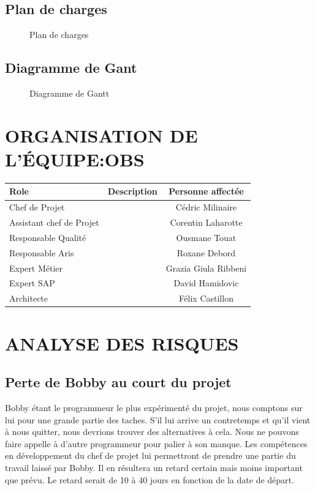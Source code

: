 \documentclass[]{scrartcl}
\begin{document}
\subsection{Plan de charges}
\begin{center}
\begin{figure}[H]
\caption{Plan de charges}
\end{figure}
\end{center}
\subsection{Diagramme de Gant}
\begin{figure}[H]
\caption{Diagramme de Gantt}
\end{figure}
\section{ORGANISATION DE L'ÉQUIPE:OBS}
\begin{center}
	\begin{tabular}{| l | c | c |}
	\hline
	Role                     & Description & Personne affectée  \\ 	\hline
	Chef de Projet           &             & Cédric Milinaire                   	\\ \hline
	Assistant chef de Projet &             & Corentin Laharotte                  	\\ \hline
	Responsable Qualité      &             & Ousmane Touat                 	\\ \hline
	Responsable Aris         &             & Roxane Debord                 	\\ \hline
	Expert Métier            &             & Grazia Giula Ribbeni                 	\\ \hline
	Expert SAP               &             & David Hamidovic                 	\\ \hline
	Architecte               &             & Félix Castillon  \\ 		\hline
	\end{tabular}
\end{center}

\section{ANALYSE DES RISQUES}
\subsection{Perte de Bobby au court du projet}
Bobby étant le programmeur le plus expérimenté du projet, nous comptons sur lui pour une grande partie des taches. S’il lui arrive un contretemps et qu’il vient à nous quitter, nous devrions trouver des alternatives à cela. Nous ne pouvons faire appelle à d’autre programmeur pour palier à son manque. Les compétences en développement du chef de projet lui permettront de prendre une partie du travail laissé par Bobby. Il en résultera un retard certain mais moins important que prévu. Le retard serait de 10 à 40 jours en fonction de la date de départ.


\begin{appendices}
\end{appendices}
\end{document}

